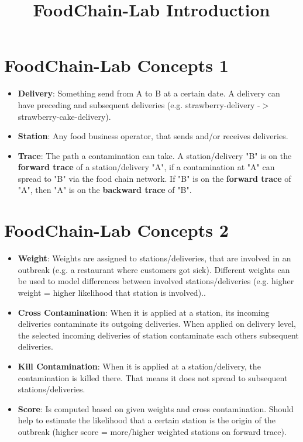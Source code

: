 \documentclass{beamer}
\title{FoodChain-Lab Introduction}
\date{}
\begin{document}
\maketitle

\section{FoodChain-Lab Concepts 1}
\begin{frame}
	\begin{itemize}
		\item \textbf{Delivery}: Something send from A to B at a certain date. A delivery can have preceding and subsequent deliveries (e.g. strawberry-delivery -$>$ strawberry-cake-delivery).
		\item \textbf{Station}: Any food business operator, that sends and/or receives deliveries.
		\item \textbf{Trace}: The path a contamination can take. A station/delivery "B" is on the \textbf{forward trace} of a station/delivery "A", if a contamination at "A" can spread to "B" via the food chain network. If "B" is on the \textbf{forward trace} of "A", then "A" is on the \textbf{backward trace} of "B".
	\end{itemize}
\end{frame}

\section{FoodChain-Lab Concepts 2}
\begin{frame}
	\begin{itemize}
		\item \textbf{Weight}: Weights are assigned to stations/deliveries, that are involved in an outbreak (e.g. a restaurant where customers got sick). Different weights can be used to model differences between involved stations/deliveries (e.g. higher weight = higher likelihood that station is involved)..
		\item \textbf{Cross Contamination}: When it is applied at a station, its incoming deliveries contaminate its outgoing deliveries. When applied on delivery level, the selected incoming deliveries of station contaminate each others subsequent deliveries.
		\item \textbf{Kill Contamination}: When it is applied at a station/delivery, the contamination is killed there. That means it does not spread to subsequent stations/deliveries.
		\item \textbf{Score}: Is computed based on given weights and cross contamination. Should help to estimate the likelihood that a certain station is the origin of the outbreak (higher score = more/higher weighted stations on forward trace).
	\end{itemize}
\end{frame}
\end{document}
